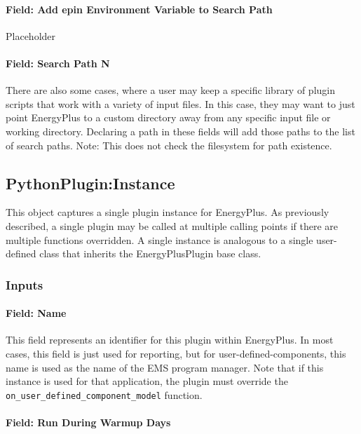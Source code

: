 \paragraph{Field: Add epin Environment Variable to Search Path}

Placeholder

\paragraph{Field: Search Path N}

There are also some cases, where a user may keep a specific library of plugin scripts that work with a variety of input files.
In this case, they may want to just point EnergyPlus to a custom directory away from any specific input file or working directory.
Declaring a path in these fields will add those paths to the list of search paths.
Note: This does not check the filesystem for path existence.

\subsection{PythonPlugin:Instance}

This object captures a single plugin instance for EnergyPlus.
As previously described, a single plugin may be called at multiple calling points if there are multiple functions overridden.
A single instance is analogous to a single user-defined class that inherits the EnergyPlusPlugin base class.

\subsubsection{Inputs}

\paragraph{Field: Name}

This field represents an identifier for this plugin within EnergyPlus.
In most cases, this field is just used for reporting, but for user-defined-components, this name is used as the name of the EMS program manager.
Note that if this instance is used for that application, the plugin must override the \verb=on_user_defined_component_model= function.

\paragraph{Field: Run During Warmup Days}

